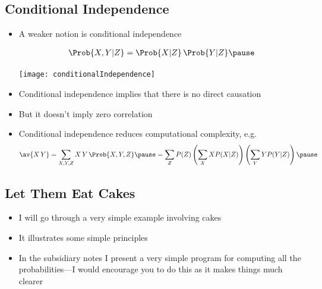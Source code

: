 \begin{slide}
\section[-1]{Conditional Independence}

\begin{PauseHighLight}
  \begin{itemize}
  \item A weaker notion is conditional independence
    \begin{minipage}{0.68\linewidth}
      \begin{align*}
        \Prob{X,Y|Z} = \Prob{X|Z} \, \Prob{Y|Z}\pause
      \end{align*}
    \end{minipage}\hfil
    \begin{minipage}{0.18\linewidth}
      \begin{center}
        \texttt{[image: conditionalIndependence]}
      \end{center}
    \end{minipage}
  \item Conditional independence implies that there is no direct
    causation\pause
  \item But it doesn't imply zero correlation\pause
  \item Conditional independence reduces computational complexity, e.g.
    {\small \begin{align*}
      \av{X\,Y} = \sum_{X,Y,Z} X\,Y \, \Prob{X, Y, Z} \pause
      = \sum_Z P(Z) \left(\sum_X X P(X|Z) \right)  \left(\sum_Y Y P(Y|Z)
      \right)\pause
    \end{align*}}
  \end{itemize}
\end{PauseHighLight}

\end{slide}


\Outline %

\begin{slide}
\section{Let Them Eat Cakes}

\begin{PauseHighLight}
  \begin{itemize}
  \item I will go through a very simple example involving cakes\pause
  \item It illustrates some simple principles\pause
  \item In the subsidiary notes I present a very simple program for
    computing all the probabilities\pause---I would encourage you to
    do this as it makes things much clearer\pauseb
  \end{itemize}
\end{PauseHighLight}

\end{slide}

